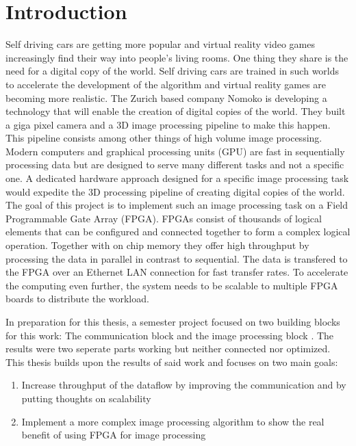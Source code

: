 
%
%
\chapter{Introduction}
Self driving cars are getting more popular and virtual reality video games
increasingly find their way into people's living rooms. One thing they share is
the need for a digital copy of the world. Self driving cars are trained in such
worlds to
accelerate the development of the algorithm and virtual reality games are
becoming more realistic. The Zurich based company Nomoko \cite{nomoko} is developing a
technology that will enable the creation of digital copies of the world. They
built a giga pixel camera and a 3D image processing pipeline to make this happen. This pipeline
consists among other things of high volume image processing. Modern computers
and graphical processing units (GPU) are fast in sequentially processing data
but are designed to serve many different tasks and not a specific one. A
dedicated hardware approach designed for a specific image processing task would
expedite the 3D processing pipeline of creating digital copies of the world.
\\

The goal of this project is to implement such an image processing task on a
Field
Programmable Gate Array (FPGA). FPGAs
consist of thousands of logical elements that can be configured and connected
together to form a complex logical operation. Together with on chip
memory they offer high throughput by processing the data in parallel in contrast to
sequential. The data is transfered to the FPGA over an Ethernet LAN connection
for
fast transfer rates. To accelerate the computing even further, the system needs
to be scalable to multiple FPGA boards to distribute the workload.

In preparation for this thesis, a semester project focused on two building
blocks for this work: The communication block and the image processing block
\cite{p5report}. The results were two seperate parts working but neither
connected nor optimized. This thesis builds upon the results of said work and
focuses on two main goals:

\begin{enumerate}
    \item Increase throughput of the dataflow by improving the communication and
    by putting thoughts on scalability
    \item Implement a more complex image processing algorithm to show the real
    benefit of using FPGA for image processing
\end{enumerate}
%     

